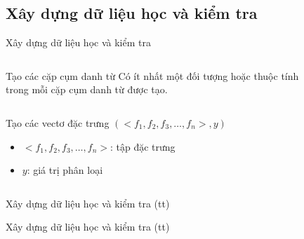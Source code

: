\documentclass[9pt,xcolor=table,hyperref=unicode]{beamer}
\begin{document}
	\subsection{Xây dựng dữ liệu học và kiểm tra}
	\begin{frame}{Xây dựng dữ liệu học và kiểm tra}				
		\begin{columns}[t]
			\begin{column}{0.4\textwidth}
			   	\begin{block}{Tạo các cặp cụm danh từ}
					Có ít nhất một đối tượng hoặc thuộc tính trong mỗi cặp cụm danh từ được tạo.
				\end{block}
			\end{column}
			\begin{column}{0.6\textwidth}  %
			 	\begin{figure}[H]
					\LARGE 
					\centering				
					\resizebox{65mm}{!}{}	
				\end{figure}
			\end{column}
		\end{columns}
		\begin{columns}[t]
			\begin{column}{\textwidth}
			   	\begin{block}{Tạo các vectơ đặc trưng}										
					$(<f_{1},f_{2},f_{3},…,f_{n}>, y)$
					\begin{itemize}
						\item{$<f_{1},f_{2},f_{3},…,f_{n}>$: tập đặc trưng}
						\item{$y$: giá trị phân loại}										
					\end{itemize}
				\end{block}					
			\end{column}			
		\end{columns}
	\end{frame}	

	\begin{frame}{Xây dựng dữ liệu học và kiểm tra (tt)}		
		\begin{table}[]		
		\parbox{\textwidth}{
			\centering			
			\fontsize{6pt}{7}\selectfont		
				
			\caption{Các đặc trưng được sử dụng trong hệ thống}
		}
		\end{table}
		\hypertarget{features}{}		
	\end{frame}	

	\begin{frame}{Xây dựng dữ liệu học và kiểm tra (tt)}		
		\begin{table}[]		
		\parbox{\textwidth}{
			\centering
			\fontsize{6pt}{7}\selectfont			
				
			\caption{Các đặc trưng được sử dụng trong hệ thống (tt)}
		}
		\end{table}
		\hyperlink{results}{}
	\end{frame}
\end{document}
